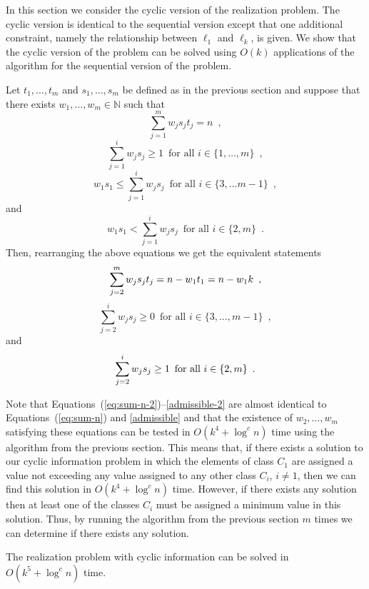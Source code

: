 \documentclass[11pt]{patmorin}
\newcommand{\N}{\mathbb{N}}
\begin{document}
In this section we consider the cyclic version of the realization
problem.  The cyclic version is identical to the sequential version
except that one additional constraint, namely the relationship between
$\ell_1$ and $\ell_k$, is given.  We show that the cyclic version of
the problem can be solved using $O(k)$ applications of the algorithm
for the sequential version of the problem.  

Let $t_1,\ldots,t_m$ and $s_1,\ldots,s_m$ be defined as in the
previous section and suppose that there exists $w_1,\ldots,w_m\in\N$ such
that
\[
   \sum_{j=1}^m w_js_jt_j = n \enspace ,
\]
\[
  \sum_{j=1}^i w_js_j \ge 1 \enspace \mbox{for all $i\in \{1,\ldots,m\}$}
   \enspace ,
\]
\[
  w_1s_1 \le \sum_{j=1}^i w_js_j
     \enspace\mbox{for all $i\in\{ 3,\ldots m-1\}$}
     \enspace ,
\] 
and
\[
  w_1s_1 < \sum_{j=1}^i w_js_j
     \enspace\mbox{for all $i\in\{ 2,m\}$}
     \enspace .
\]
Then, rearranging the above equations we get the equivalent statements
\begin{equation}
\sum_{j=2}^m w_js_jt_j = n - w_1t_1 = n-w_1k  \eqlabel{sum-n-2}
\enspace ,
\end{equation}
\begin{equation}
   \sum_{j=2}^i w_js_j \ge 0
       \enspace\mbox{for all $i\in\{3,\ldots,m-1\}$}
       \enspace  , 
\end{equation}
and
\begin{equation}
   \sum_{j=2}^i w_js_j \ge 1
       \enspace\mbox{for all $i\in\{2,m\}$}
       \enspace .  \eqlabel{admissible-2}
\end{equation}

Note that Equations~(\ref{eq:sum-n-2})--\eqref{admissible-2} are
almost identical to Equations~(\ref{eq:sum-n}) and \eqref{admissible}
and that the existence of $w_2,\ldots,w_m$ satisfying these equations
can be tested in $O(k^4+\log^c n)$ time using the algorithm from the
previous section.  This means that, if there exists a solution to our
cyclic information problem in which the elements of class $C_1$ are
assigned a value not exceeding any value assigned to any other class
$C_i$, $i\neq 1$, then we can find this solution in $O(k^4+\log^c n)$
time.  However, if there exists any solution then at least one of the
classes $C_i$ must be assigned a minimum value in this solution.
Thus, by running the algorithm from the previous section $m$ times we
can determine if there exists any solution.

\begin{thm}
The realization problem with cyclic information can be solved in
$O(k^5+\log^c n)$ time.
\end{thm}
\end{document}
